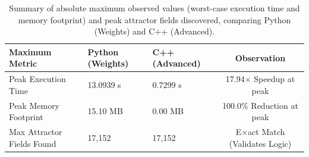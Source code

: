 \begin{table}
\caption{Summary of absolute maximum observed values (worst-case execution time and memory footprint) and peak attractor fields discovered, comparing Python (Weights) and C++ (Advanced).}
\label{tab:max_values}
\begin{tabular}{lllc}
\toprule
\textbf{Maximum Metric} & \textbf{Python (Weights)} & \textbf{C++ (Advanced)} & \textbf{Observation} \\
\midrule
Peak Execution Time & 13.0939 s & 0.7299 s & 17.94$\times$ Speedup at peak \\
Peak Memory Footprint & 15.10 MB & 0.00 MB & 100.0\% Reduction at peak \\
Max Attractor Fields Found & 17,152 & 17,152 & E$\times$act Match (Validates Logic) \\
\bottomrule
\end{tabular}
\end{table}
